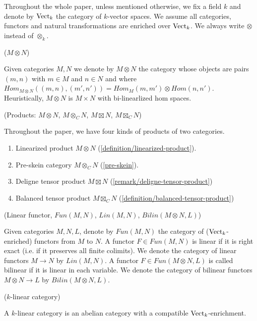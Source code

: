 Throughout the whole paper, unless mentioned otherwise, we fix a field $k$ and
denote by $\operatorname{Vect}_k$ the category of $k$-vector spaces. We assume all
categories, functors and natural transformations are enriched over $\operatorname{Vect}_k$.
We always write $\otimes$ instead of $\otimes_k$.

\begin{definition} \label{definition/linearized-product} ($M \otimes N$)

\noindent
Given categories $M,N$ we denote by $M\otimes N$ the category whose objects
are pairs $(m,n)$ with $m\in M$ and $n\in N$ and where $Hom_{M\otimes
N}((m,n),(m',n'))=Hom_M(m,m')\otimes Hom(n,n')$. Heuristically, $M \otimes N$
is $M \times N$ with bi-linearlized hom spaces.
\end{definition}

\begin{remark} (Products: $M \otimes N$, $M \otimes_C N$, $M \boxtimes N$, $M \boxtimes_C N$)

  \noindent Throughout the paper, we have four kinds of products of two categories.
  \begin{enumerate}
    \item Linearized product $M \otimes N$ (\ref{definition/linearized-product}).
    \item Pre-skein category $M\otimes_C N$ (\ref{pre-skein}).
    \item Deligne tensor product $M \boxtimes N$ (\ref{remark/deligne-tensor-product})
    \item Balanced tensor product $M \boxtimes_C N$ (\ref{definition/balanced-tensor-product})
  \end{enumerate}
\end{remark}

\begin{definition} (Linear functor, $Fun(M,N)$, $Lin(M,N)$, $Bilin(M \otimes N, L)$)

  \noindent Given categories $M, N, L$, denote by $Fun(M,N)$ the category of
  ($\operatorname{Vect}_k$-enriched) functors from $M$ to $N$. A functor $F \in Fun(M,N)$ is
  linear if it is right exact (i.e. if it preserves all finite colimits). We
  denote the category of linear functors $M \to N$ by $Lin(M,N)$. A functor
  $F \in Fun(M \otimes N, L)$ is called bilinear if it is linear in each
  variable. We denote the category of bilinear functors $M\otimes N \to L$ by
  $Bilin(M\otimes N, L)$.
\end{definition}

\begin{definition} \label{definition/k-linear-category} ($k$-linear category) \cite{douglas/balanced-product}

\noindent A $k$-linear category is an abelian category with a compatible $\operatorname{Vect}_{k}$-enrichment.
\end{definition}

